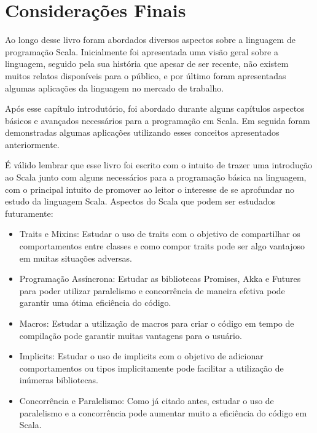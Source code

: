 

\chapter{Considera\c{c}\~{o}es Finais}
	Ao longo desse livro foram abordados diversos aspectos sobre a linguagem de programação Scala. Inicialmente foi apresentada uma visão geral sobre a linguagem, seguido pela sua história que apesar de ser recente, não existem muitos relatos disponíveis para o público, e por último foram apresentadas algumas aplicações da linguagem no mercado de trabalho. 
	
	Após esse capítulo introdutório, foi abordado durante alguns capítulos aspectos básicos e avançados necessários para a programação em Scala. Em seguida foram demonstradas algumas aplicações utilizando esses conceitos apresentados anteriormente.
	
	É válido lembrar que esse livro foi escrito com o intuito de trazer uma introdução ao Scala junto com alguns necessários para a programação básica na linguagem, com o principal intuito de promover ao leitor o interesse de se aprofundar no estudo da linguagem Scala. 
	Aspectos do Scala que podem ser estudados futuramente:
	\begin{itemize}
		\item Traits e Mixins: Estudar o uso de traits com o objetivo de compartilhar os comportamentos entre classes e como compor traits pode ser algo vantajoso em muitas situações adversas.
		
		\item Programação Assíncrona: Estudar as bibliotecas Promises, Akka e Futures para poder utilizar paralelismo e concorrência de maneira efetiva pode garantir uma ótima eficiência do código.
		
		\item Macros: Estudar a utilização de macros para criar o código em tempo de compilação pode garantir muitas vantagens para o usuário.
		
		\item Implicits: Estudar o uso de implicits com o objetivo de adicionar comportamentos ou tipos implicitamente pode facilitar a utilização de inúmeras bibliotecas.
		
		\item Concorrência e Paralelismo: Como já citado antes, estudar o uso de paralelismo e a concorrência pode aumentar muito a eficiência do código em Scala.
		\end{itemize}

